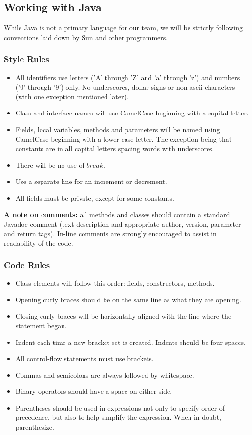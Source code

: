 \documentclass[12pt]{article}
\begin{document}
\subsection{Working with Java}
While Java is not a primary language for our team, we will be strictly following conventions laid down by Sun and other programmers\cite{JavaStyle-Sun}\cite{JavaStyle-JavaRanch}.

\subsubsection{Style Rules}
\begin{itemize}
\item All identifiers use letters ('A' through 'Z' and 'a' through 'z') and numbers ('0' through '9') only. No underscores, dollar signs or non-ascii characters (with one exception mentioned later).
\item Class and interface names will use CamelCase beginning with a capital letter.
\item Fields, local variables, methods and parameters will be named using CamelCase beginning with a lower case letter.  The exception being that constants are in all capital letters spacing words with underscores.
\item There will be no use of $break$.
\item Use a separate line for an increment or decrement.
\item All fields must be private, except for some constants. 
\end{itemize}
\textbf{A note on comments:} all methods and classes should contain a standard Javadoc comment (text description and appropriate author, version, parameter and return tags).  In-line comments are strongly encouraged to assist in readability of the code.

\subsubsection{Code Rules}
\begin{itemize}
\item Class elements will follow this order: fields, constructors, methods.
\item Opening curly braces should be on the same line as what they are opening.
\item Closing curly braces will be horizontally aligned with the line where the statement began.
\item Indent each time a new bracket set is created.  Indents should be four spaces.
\item All control-flow statements must use brackets.
\item Commas and semicolons are always followed by whitespace.
\item Binary operators should have a space on either side.
\item Parentheses should be used in expressions not only to specify order of precedence, but also to help simplify the expression. When in doubt, parenthesize. 
\end{itemize}
\end{document}
